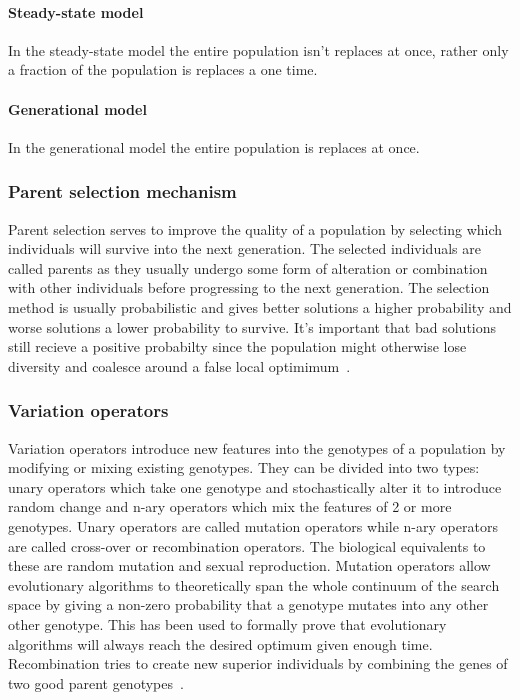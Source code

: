 \paragraph{Steady-state model}

In the steady-state model the entire population isn't replaces at once, rather only a fraction of the population is replaces a one time.

\paragraph{Generational model}

In the generational model the entire population is replaces at once.

\subsubsection{Parent selection mechanism}

Parent selection serves to improve the quality of a population by selecting which individuals will survive into the next generation. The selected individuals are called parents as they usually undergo some form of alteration or combination with other individuals before progressing to the next generation. The selection method is usually probabilistic and gives better solutions a higher probability and worse solutions a lower probability to survive. It's important that bad solutions still recieve a positive probabilty since the population might otherwise lose diversity and coalesce around a false local optimimum~\cite{Eiben2015_whatevolutionary}.


\subsubsection{Variation operators}

Variation operators introduce new features into the genotypes of a population by modifying or mixing existing genotypes. They can be divided into two types: unary operators which take one genotype and stochastically alter it to introduce random change and n-ary operators which mix the features of 2 or more genotypes. Unary operators are called mutation operators while n-ary operators are called cross-over or recombination operators. The biological equivalents to these are random mutation and sexual reproduction. Mutation operators allow evolutionary algorithms to theoretically span the whole continuum of the search space by giving a non-zero probability that a genotype mutates into any other other genotype. This has been used to formally prove that evolutionary algorithms will always reach the desired optimum given enough time. Recombination tries to create new superior individuals by combining the genes of two good parent genotypes~\cite{Eiben2015_whatevolutionary, Eiben20021}.

